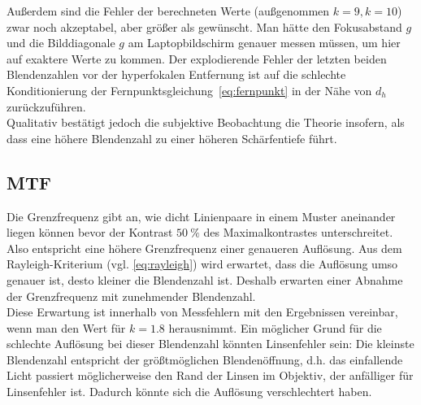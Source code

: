 Außerdem sind die Fehler der berechneten Werte (außgenommen $k=9, k=10$) zwar noch akzeptabel, aber größer als gewünscht. Man hätte den Fokusabstand $g$ und die Bilddiagonale $g$ am Laptopbildschirm genauer messen müssen, um hier auf exaktere Werte zu kommen. Der explodierende Fehler der letzten beiden Blendenzahlen vor der hyperfokalen Entfernung ist auf die schlechte Konditionierung der Fernpunktsgleichung~\cref{eq:fernpunkt} in der Nähe von $d_h$ zurückzuführen.\\

Qualitativ bestätigt jedoch die subjektive Beobachtung die Theorie insofern, als dass eine höhere Blendenzahl zu einer höheren Schärfentiefe führt.

\subsection{MTF}
Die Grenzfrequenz gibt an, wie dicht Linienpaare in einem Muster aneinander liegen können bevor der Kontrast $\SI{50}{\percent}$ des Maximalkontrastes unterschreitet. Also entspricht eine höhere Grenzfrequenz einer genaueren Auflösung. Aus dem Rayleigh-Kriterium (vgl. \cref{eq:rayleigh}) wird erwartet, dass die Auflösung umso genauer ist, desto kleiner die Blendenzahl ist. Deshalb erwarten einer Abnahme der Grenzfrequenz mit zunehmender Blendenzahl.\\

Diese Erwartung ist innerhalb von Messfehlern mit den Ergebnissen vereinbar, wenn man den Wert für $k=1.8$ herausnimmt. Ein möglicher Grund für die schlechte Auflösung bei dieser Blendenzahl könnten Linsenfehler sein: Die kleinste Blendenzahl entspricht der größtmöglichen Blendenöffnung, d.h. das einfallende Licht passiert möglicherweise den Rand der Linsen im Objektiv, der anfälliger für Linsenfehler ist. Dadurch könnte sich die Auflösung verschlechtert haben.
